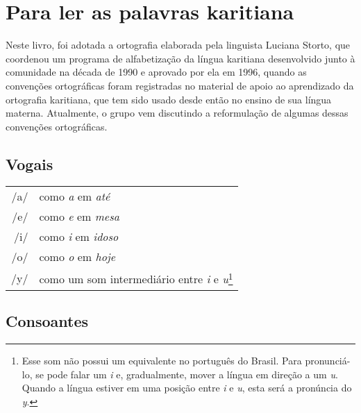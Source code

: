 \chapter{Para ler as palavras karitiana}

Neste livro, foi adotada a ortografia elaborada pela linguista Luciana
Storto, que coordenou um programa de alfabetização da língua karitiana
desenvolvido junto à comunidade na década de 1990 e aprovado por ela em
1996, quando as convenções ortográficas foram registradas no material de
apoio ao aprendizado da ortografia karitiana, que tem sido usado desde
então no ensino de sua língua materna. Atualmente, o grupo vem
discutindo a reformulação de algumas dessas convenções ortográficas.

\section{Vogais}

\begingroup
\begin{tabular}{rl}
/a/ & como \textit{a} em \textit{até}\\
/e/ & como \textit{e} em \textit{mesa}\\
/i/ & como \textit{i} em \textit{idoso}\\
/o/ & como \textit{o} em \textit{hoje}\\
/y/ & como um som intermediário entre \textit{i} e \textit{u}\protect\footnote{Esse som não possui um
equivalente no português do Brasil. Para pronunciá-lo, se pode falar um
\textit{i} e, gradualmente, mover a língua em direção a um \textit{u}. Quando a
língua estiver em uma posição entre \textit{i} e \textit{u}, esta será a pronúncia
do \textit{y}.}\\
\end{tabular}
\endgroup

\section{Consoantes}


